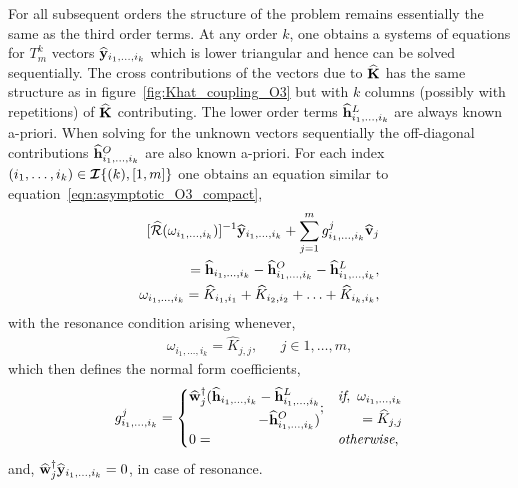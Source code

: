 For all subsequent orders the structure of the problem remains essentially the same as the third order terms. At any order $k$, one obtains a systems of equations for $T^{k}_{m}$ vectors $\widehat{\mathbf{y}}_{i_{1},\ldots,i_{k}}$ which is lower triangular and hence can be solved sequentially. The cross contributions of the vectors due to $\mathbf{\widehat{K}}$ has the same structure as in figure~\ref{fig:Khat_coupling_O3} but with $k$ columns (possibly with repetitions) of $\mathbf{\widehat{K}}$ contributing. The lower order terms $\widehat{\mathbf{h}}^{L}_{i_{1},\ldots,i_{k}}$ are always known a-priori. When solving for the unknown vectors sequentially the off-diagonal contributions $\widehat{\mathbf{h}}^{O}_{i_{1},\ldots,i_{k}}$ are also known a-priori. For each index $(i_{1},\ldots,i_{k})\in\bm{\mathcal{I}}\{(k),[1,m]\}$ one obtains an equation similar to equation~\eqref{eqn:asymptotic_O3_compact}, 
\begin{subequations}
	\label{eqn:asymptotic_Ok_compact}
	\begin{align}
		\begin{aligned}
			\ResolventHat{\omega_{i_{1},\ldots,i_{k}}}^{-1}\AsECenM_{i_{1},\ldots,i_{k}} + \sum^{m}_{j=1}\AsParamEl^{j}_{i_{1},\ldots,i_{k}}\EDevec_{j} \\
			 = \AsEForcing_{i_{1},\ldots,i_{k}} - \AsEForcingO_{i_{1},\ldots,i_{k}} 
			 - \AsEForcingL_{i_{1},\ldots,i_{k}},
		\end{aligned}\\
		\omega_{i_{1},\ldots,i_{k}} = \widehat{K}_{i_{1},i_{1}} + \widehat{K}_{i_{2},i_{2}} + \ldots + \widehat{K}_{i_{k},i_{k}},
	\end{align}
\end{subequations}
with the resonance condition arising whenever, 
\begin{align}
	\label{eqn:resonance_condition_Ok}
	\omega_{i_{1},\ldots,i_{k}} = \widehat{K}_{j,j}, && j\in 1,\ldots,m,
\end{align}
which then defines the normal form coefficients,
\begin{equation}
	\label{eqn:gk_definition}
	g^{j}_{i_{1},\ldots,i_{k}} =
	\begin{cases}
		\begin{split}
			\widehat{\mathbf{w}}_{j}^{\dagger}(\widehat{\mathbf{h}}_{i_{1},\ldots,i_{k}} 
			- \widehat{\mathbf{h}}^{L}_{i_{1},\ldots,i_{k}} \\
			- \widehat{\mathbf{h}}^{O}_{i_{1},\ldots,i_{k}})
		\end{split}; & 
		\begin{split}
			\textit{if},\ \omega_{i_{1},\ldots,i_{k}}\\
			= \widehat{K}_{j,j}
		\end{split} \\
		 0 = & \textit{otherwise},
	\end{cases}
\end{equation}
and, $\widehat{\mathbf{w}}_{j}^{\dagger}\widehat{\mathbf{y}}_{i_{1},\ldots,i_{k}} = 0$, in case of resonance. 

